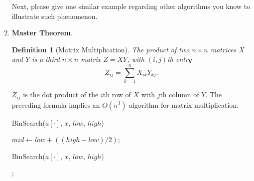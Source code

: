 \documentclass[12pt,a4paper]{article}
\makeatletter
\newtheorem*{solution}{Solution}
\newtheorem{definition}{Definition}
\theoremstyle{definition}
\renewenvironment{solution}[1][Solution] {\par\pushQED{\qed}\normalfont\topsep6\p@\@plus6\p@\relax\trivlist\item[\hskip\labelsep\bfseries#1\@addpunct{.}]\ignorespaces}{\popQED\endtrivlist\@endpefalse} \makeatother
\makeatother
\begin{document}
\begin{enumerate}
    Next, please give one similar example regarding other algorithms you know to illustrate such phenomenon.

\item  \textbf{Master Theorem}.

\begin{definition}[Matrix Multiplication]
The product of two $n \times n$ matrices $X$ and $Y$ is a third $n \times n$ matrix $Z = XY$, with $(i,j)$th entry
$$Z_{ij}=\sum_{k=1}^{n}X_{ik}Y_{kj}.$$
\end{definition}
$Z_{ij}$ is the dot product of the $i$th row of $X$ with $j$th column of $Y$. The preceding formula implies an $O(n^3)$ algorithm for matrix multiplication.

\begin{minipage}[t]{0.49\textwidth}
\begin{algorithm}[H]
	\BlankLine
	\caption{BinSearch($a[\cdot]$, $x$, $low$, $high$)} \label{Alg-RecursiveBS}
	\BlankLine
    $mid \leftarrow low +((high - low) / 2)$;
    
    
\end{algorithm}
\end{minipage}
\begin{minipage}[t]{0.455\textwidth}
\begin{algorithm}[H]
\BlankLine
	\caption{BinSearch($a[\cdot]$, $x$, $low$, $high$)} \label{Alg-NonRecursiveBS}
		
	\BlankLine	
	;
\end{algorithm}\end{minipage}




\end{enumerate}
\end{document}
